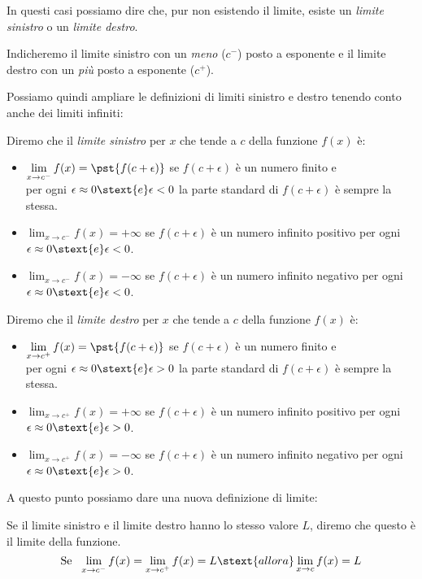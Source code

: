 In questi casi possiamo dire che, pur non esistendo il limite, esiste un 
\emph{limite sinistro} o un \emph{limite destro}.

Indicheremo il limite sinistro con un \emph{meno} (\(c^-\)) posto a esponente 
e il limite destro con un \emph{più} posto a esponente (\(c^+\)).

Possiamo quindi ampliare le definizioni di limiti sinistro e destro tenendo 
conto anche dei limiti infiniti:

\begin{definizione}
Diremo che il \emph{limite sinistro} per \(x\) che tende a \(c\) 
della funzione \(f(x)\) è:
\noindent \begin{itemize}
\item 
\(\displaystyle \lim_{x \to c^-}f(x) = \pst{f(c+\epsilon)}\)
se \(f(c+\epsilon)\) è un numero finito e \\
per ogni \(\epsilon \approx 0 \stext{e} \epsilon < 0\)
la parte standard di \(f(c+\epsilon)\) è sempre la stessa.
\item 
\(\displaystyle \lim_{x \to c^-}f(x) = +\infty\)
se \(f(c+\epsilon)\) è un numero infinito positivo 
per ogni \(\epsilon \approx 0 \stext{e} \epsilon < 0\).
\item 
\(\displaystyle \lim_{x \to c^-}f(x) = -\infty\)
se \(f(c+\epsilon)\) è un numero infinito negativo 
per ogni \(\epsilon \approx 0 \stext{e} \epsilon < 0\).
\end{itemize}
\end{definizione}

\begin{definizione}
Diremo che il \emph{limite destro} per \(x\) che tende a \(c\) 
della funzione \(f(x)\) è:
\begin{itemize}
\item 
\(\displaystyle \lim_{x \to c^+}f(x) = \pst{f(c+\epsilon)}\)
se \(f(c+\epsilon)\) è un numero finito e \\
per ogni \(\epsilon \approx 0 \stext{e} \epsilon > 0\)
la parte standard di \(f(c+\epsilon)\) è sempre la stessa.
\item 
\(\displaystyle \lim_{x \to c^+}f(x) = +\infty\)
se \(f(c+\epsilon)\) è un numero infinito positivo 
per ogni \(\epsilon \approx 0 \stext{e} \epsilon > 0\).
\item 
\(\displaystyle \lim_{x \to c^+}f(x) = -\infty\)
se \(f(c+\epsilon)\) è un numero infinito negativo 
per ogni \(\epsilon \approx 0 \stext{e} \epsilon > 0\).
\end{itemize}
\end{definizione}
A questo punto possiamo dare una nuova definizione di limite:
\begin{definizione}
Se il limite sinistro e il limite destro hanno lo stesso valore \(L\), 
diremo che questo è il limite della funzione.
\[\displaystyle \text{Se }~
\lim_{x \to c^-}f(x) = \lim_{x \to c^+}f(x) = L \stext{ allora }
\lim_{x \to c}f(x) = L \]
\end{definizione}

